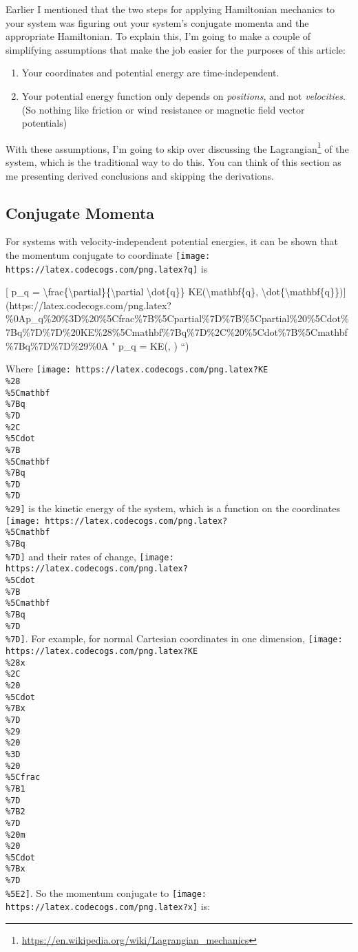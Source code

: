 \documentclass[]{article}
\renewcommand{\href}[2]{#2\footnote{\url{#1}}}
\begin{document}
Earlier I mentioned that the two steps for applying Hamiltonian mechanics to
your system was figuring out your system's conjugate momenta and the appropriate
Hamiltonian. To explain this, I'm going to make a couple of simplifying
assumptions that make the job easier for the purposes of this article:

\begin{enumerate}
\def\labelenumi{\arabic{enumi}.}
\tightlist
\item
  Your coordinates and potential energy are time-independent.
\item
  Your potential energy function only depends on \emph{positions}, and not
  \emph{velocities}. (So nothing like friction or wind resistance or magnetic
  field vector potentials)
\end{enumerate}

With these assumptions, I'm going to skip over discussing the
\href{https://en.wikipedia.org/wiki/Lagrangian_mechanics}{Lagrangian} of the
system, which is the traditional way to do this. You can think of this section
as me presenting derived conclusions and skipping the derivations.

\subsection{Conjugate Momenta}\label{conjugate-momenta}

For systems with velocity-independent potential energies, it can be shown that
the momentum conjugate to coordinate
\texttt{[image: https://latex.codecogs.com/png.latex?q]} is

{[} p\_q =
\textbackslash{}frac\{\textbackslash{}partial\}\{\textbackslash{}partial
\textbackslash{}dot\{q\}\} KE(\textbackslash{}mathbf\{q\},
\textbackslash{}dot\{\textbackslash{}mathbf\{q\}\}){]}(https://latex.codecogs.com/png.latex?\%0Ap\_q\%20\%3D\%20\%5Cfrac\%7B\%5Cpartial\%7D\%7B\%5Cpartial\%20\%5Cdot\%7Bq\%7D\%7D\%20KE\%28\%5Cmathbf\%7Bq\%7D\%2C\%20\%5Cdot\%7B\%5Cmathbf\%7Bq\%7D\%7D\%29\%0A
" p\_q =  KE(, ) ``)

Where
\texttt{[image: https://latex.codecogs.com/png.latex?KE\\\%28\\\%5Cmathbf\\\%7Bq\\\%7D\\\%2C\\\%5Cdot\\\%7B\\\%5Cmathbf\\\%7Bq\\\%7D\\\%7D\\\%29]}
is the kinetic energy of the system, which is a function on the coordinates
\texttt{[image: https://latex.codecogs.com/png.latex?\\\%5Cmathbf\\\%7Bq\\\%7D]} and
their rates of change,
\texttt{[image: https://latex.codecogs.com/png.latex?\\\%5Cdot\\\%7B\\\%5Cmathbf\\\%7Bq\\\%7D\\\%7D]}.
For example, for normal Cartesian coordinates in one dimension,
\texttt{[image: https://latex.codecogs.com/png.latex?KE\\\%28x\\\%2C\\\%20\\\%5Cdot\\\%7Bx\\\%7D\\\%29\\\%20\\\%3D\\\%20\\\%5Cfrac\\\%7B1\\\%7D\\\%7B2\\\%7D\\\%20m\\\%20\\\%5Cdot\\\%7Bx\\\%7D\\\%5E2]}.
So the momentum conjugate to
\texttt{[image: https://latex.codecogs.com/png.latex?x]} is:
\end{document}

